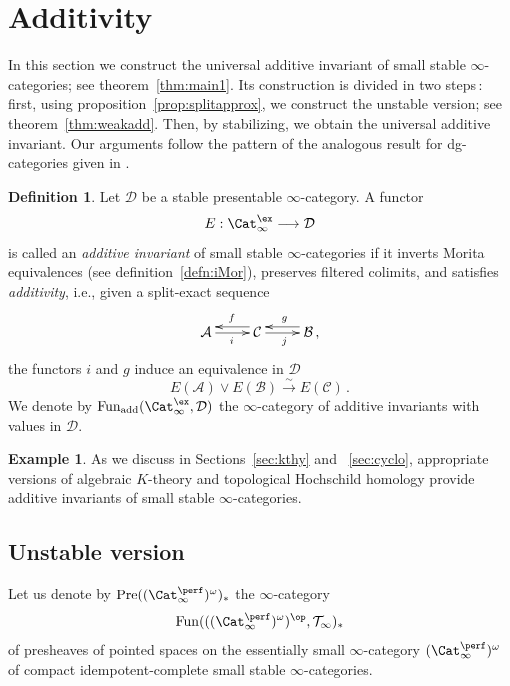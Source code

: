 \documentclass{amsart}
\newcommand{\cA}{{\mathcal A}}
\newcommand{\cB}{{\mathcal B}}
\newcommand{\cC}{{\mathcal C}}
\newcommand{\cD}{{\mathcal D}}
\let\catsymbfont\mathcal
\newcommand{\aD}{{\catsymbfont{D}}}
\newcommand{\aT}{{\catsymbfont{T}}}
\newcommand{\Pre}{\mathrm{Pre}}
\newcommand{\stabcat}{\Cat_\i^{\ex}}
\newcommand{\idemstabcat}{\Cat_\i^{\perf}}
\newcommand{\Fun}{\mathrm{Fun}} %
\newcommand{\too}{\longrightarrow}%
\renewcommand{\i}{\infty}
\numberwithin{equation}{section}
\theoremstyle{definition}
\newtheorem{definition}[equation]{Definition}
\newtheorem{example}[equation]{Example}
\begin{document}
\section{Additivity}\label{sec:additive}

In this section we construct the universal additive invariant of small
stable $\i$-categories; see theorem~\ref{thm:main1}.  Its construction
is divided in two steps\,: first, using
proposition~\ref{prop:splitapprox}, we construct the unstable version;
see theorem~\ref{thm:weakadd}. Then, by stabilizing, we obtain the
universal additive invariant.  Our arguments follow the pattern of the
analogous result for dg-categories given in \cite{Duke}.

\begin{definition}\label{def:additive}
Let $\aD$ be a stable presentable $\i$-category. A functor
$$ E: \stabcat \too \aD$$
is called an {\em additive invariant} of small stable $\i$-categories if it inverts Morita equivalences (see definition~\ref{defn:iMor}), preserves filtered colimits, and satisfies {\em additivity}, i.e., given a split-exact sequence
\begin{equation}\label{number3}
\xymatrix{
\cA \ar[r]_{i} & \cC \ar@<-1ex>[l]_f
\ar[r]_j & \cB \ar@<-1ex>[l]_{g} \,,
}
\end{equation}
the functors $i$ and $g$ induce an equivalence in $\cD$
$$ E(\cA) \vee E(\cB) \stackrel{\sim}{\too} E(\cC)\,.$$
We denote by $\Fun_{\mathrm{add}}(\stabcat, \cD)$ the $\i$-category of additive invariants with values in $\cD$.
\end{definition}

\begin{example}
As we discuss in Sections~\ref{sec:kthy} and ~\ref{sec:cyclo},
appropriate versions of algebraic $K$-theory and topological
Hochschild homology provide additive invariants of small stable
$\i$-categories.
\end{example}

\subsection{Unstable version}
Let us denote by $\Pre((\idemstabcat)^{\omega})_*$ the $\i$-category $$\Fun(((\idemstabcat)^{\omega})^{\op}, \aT_{\i})_*$$ of presheaves
of pointed spaces on the essentially small $\i$-category
$(\idemstabcat)^{\omega}$ of compact idempotent-complete small stable
$\i$-categories.
\end{document}
